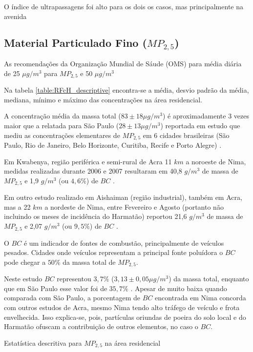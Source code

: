 O índice de ultrapassagens foi alto para os dois os casos, 
mas principalmente na avenida

\subsection{Material Particulado Fino ($MP_{2,5}$)}

As recomendações da Organização Mundial de Sáude (OMS) para média diária de 
25 $\mu g/m^3$ para $MP_{2,5}$ e 50 $\mu g/m^3$ 

Na tabela \ref{table:RFcH_descriptive} encontra-se a média, desvio padrão da média, 
mediana, mínimo e máximo das concentrações na área residencial. 

A concentração média da massa total ($83\pm 18 \mu g / m^3$) é aproximadamente
3 vezes maior que a relatada para São Paulo ($28\pm 13 \mu g / m^3$) reportada 
em estudo que mediu as concentrações elementares de $MP_{2,5}$ em 6 cidades 
brasileiras (São Paulo, Rio de Janeiro, Belo Horizonte, Curitiba, Recife e 
Porto Alegre) \cite{andrade2012}. 

Em Kwabenya, região periférica e semi-rural de Acra 11 $km$ a noroeste de Nima, 
medidas realizadas durante 2006 e 2007 resultaram em 40,8 $g / m^3$ de massa de 
$MP_{2,5}$ e 1,9 $g / m^3$ (ou $4,6\%$) de $BC$ \citep{aboh2009}.

Em outro estudo realizado em Aishaiman (região industrial), também em Acra, 
mas a 22 $km$ a nordeste de Nima, entre Fevereiro e Agosto (portanto não 
incluindo os meses de incidência do Harmatão) reportou 21,6 $g / m^3$ de massa 
de $MP_{2,5}$ e 2,07 $g / m^3$ (ou $9,5\%$) de $BC$ \citep{ofosu2012}.

O $BC$ é um indicador de fontes de combustão, principalmente de veículos pesados.
Cidades onde veículos representam a principal fonte poluídora o $BC$ pode chegar 
a $50\%$ da massa total de $MP_{2,5}$.  

Neste estudo $BC$ representou $3,7 \%$ ($3,13\pm 0,05 \mu g / m^3$) da massa 
total, enquanto que em São Paulo esse valor foi de $35,7 \%$ \citep{andrade2012}.
Apesar de muito baixa quando comparada com São Paulo, a porcentagem de $BC$ 
encontrada em Nima concorda com outros estudos de Acra, mesmo Nima tendo alto
tráfego de veículo e frota envelhecida. Isso explica-se, pois, partículas 
oriundas de poeira do solo local e do Harmatão ofuscam a contribuição de outros
elementos, no caso o $BC$. 

\begin{table}[H]
  \centering
    
  \caption{Estatística descritiva para $MP_{2,5}$ na área residencial
            \label{table:RFcH_descriptive}}
\end{table}

